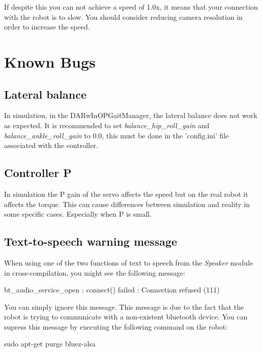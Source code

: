 \documentclass[a4paper, 12pt]{article}  		%
\begin{document}
If despite this you can not achieve a speed of 1.0x, it means that your connection with the robot is to slow. You should consider reducing camera resolution in order to increase the speed.\\


\newpage
\section{Known Bugs}

\subsection{Lateral balance}
In simulation, in the DARwInOPGaitManager, the lateral balance does not work as expected. It is recommended to set \textit{balance\_hip\_roll\_gain} and \textit{balance\_ankle\_roll\_gain} to 0.0, this must be done in the 'config.ini' file associated with the controller.\\

\subsection{Controller P}
In simulation the P gain of the servo affects the speed but on the real robot it affects the torque. This can cause differences between simulation and reality in some specific cases. Especially when P is small.\\

\subsection{Text-to-speech warning message}
When using one of the two functions of text to speech from the \textit{Speaker} module in cross-compilation, you might see the following message:
\begin{center}
bt\_audio\_service\_open : connect() failed : Connection refused (111)
\end{center}
You can simply ignore this message. This message is due to the fact that the robot is trying to communicate with a non-existent bluetooth device. You can supress this message by executing the following command on the robot:
\begin{center}
sudo apt-get purge bluez-alsa
\end{center}

\end{document}

